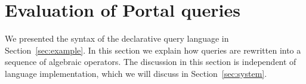 \section{Evaluation of Portal queries}
\label{sec:eval}

We presented the syntax of the declarative query language \ql in
Section~\ref{sec:example}.  In this section we explain how \ql queries
are rewritten into a sequence of algebraic operators.  The discussion
in this section is independent of language implementation, which we
will discuss in Section~\ref{sec:system}.
